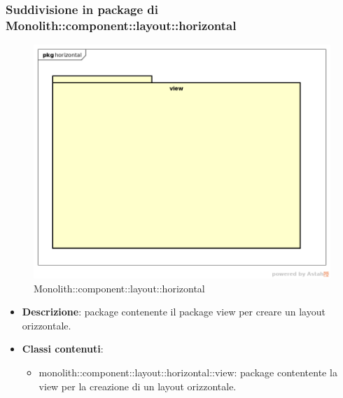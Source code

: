 \subsubsection{Suddivisione in package  di Monolith::component::layout::horizontal}
\label{Monolith::component::layout::horizontal}
\begin{figure}[H]
	\centering
	\includegraphics[scale=0.5]{Sezioni/imgPackage/component_layout_horizontal.png}
	\caption{Monolith::component::layout::horizontal}
\end{figure}
\begin{itemize}
	\item{\textbf{Descrizione}}: package contenente il package view per creare un layout orizzontale.
	\item{\textbf{Classi contenuti}}:
	\begin{itemize}
	\item{monolith::component::layout::horizontal::view}: package contentente la view per la creazione di un layout orizzontale.
	\end{itemize}
\end{itemize}

